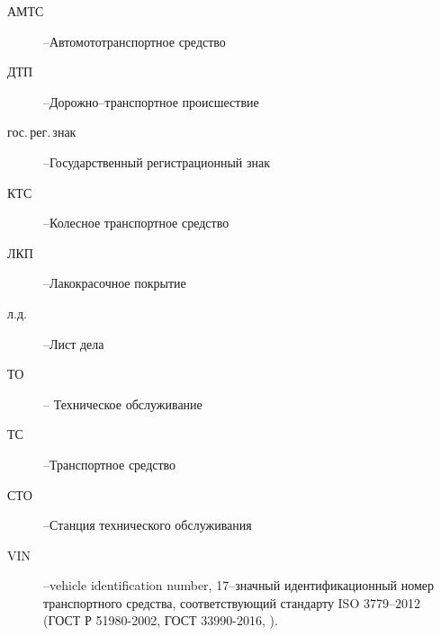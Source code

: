 \begin{description}
	\item[АМТС] --Автомототранспортное средство
	\item[ДТП] --Дорожно--транспортное происшествие
	\item[гос.\,рег.\,знак] --Государственный регистрационный знак
	\item[КТС] --Колесное транспортное средство 
	\item[ЛКП] --Лакокрасочное покрытие
	\item[л.д.] --Лист дела
	\item[ТО] -- Техническое обслуживание
	\item[ТС] --Транспортное средство
	\item[СТО] --Станция технического обслуживания
	\item[VIN] --vehicle identification number, 17--значный идентификационный номер транспортного средства, соответствующий стандарту ISO 3779--2012 (ГОСТ Р 51980-2002, ГОСТ 33990-2016, \cite{51980:gost}).
\end{description}